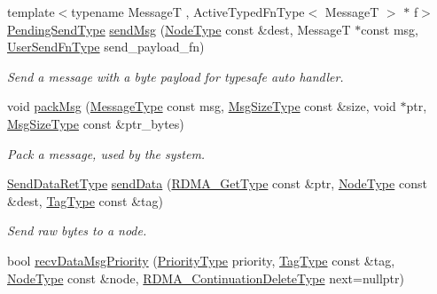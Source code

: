 \begin{DoxyCompactItemize}
{\footnotesize template$<$typename MessageT , Active\+Typed\+Fn\+Type$<$ Message\+T $>$ $\ast$ f$>$ }\\\hyperlink{structvt_1_1messaging_1_1_active_messenger_a3626a6ca76d8ad4ec7c3b47a2c70d3a8}{Pending\+Send\+Type} \hyperlink{group__sendpayload_ga887dfedb337701fc731c67ba19cf86c8}{send\+Msg} (\hyperlink{namespacevt_a866da9d0efc19c0a1ce79e9e492f47e2}{Node\+Type} const \&dest, MessageT $\ast$const msg, \hyperlink{structvt_1_1messaging_1_1_active_messenger_a4b1993ad77436b6ed6c7fd32801c50ed}{User\+Send\+Fn\+Type} send\+\_\+payload\+\_\+fn)
\begin{DoxyCompactList}\small\item\em Send a message with a byte payload for typesafe auto handler. \end{DoxyCompactList}\item 
void \hyperlink{structvt_1_1messaging_1_1_active_messenger_af349201b71468a049f09ccad48ac359d}{pack\+Msg} (\hyperlink{structvt_1_1messaging_1_1_active_messenger_a8a749506cb4813230f9bfeeac1b119c9}{Message\+Type} const msg, \hyperlink{namespacevt_abfa009d900299ac1df967b40ea8f2c8a}{Msg\+Size\+Type} const \&size, void $\ast$ptr, \hyperlink{namespacevt_abfa009d900299ac1df967b40ea8f2c8a}{Msg\+Size\+Type} const \&ptr\+\_\+bytes)
\begin{DoxyCompactList}\small\item\em Pack a message, used by the system. \end{DoxyCompactList}\item 
\hyperlink{structvt_1_1messaging_1_1_active_messenger_a839987e944b6b9c681bc56efbea1f220}{Send\+Data\+Ret\+Type} \hyperlink{structvt_1_1messaging_1_1_active_messenger_ac4385fea0c9cc860b5af24fea2f89a1d}{send\+Data} (\hyperlink{namespacevt_a1cab7f4860f65a49ad2c042d6240f288}{R\+D\+M\+A\+\_\+\+Get\+Type} const \&ptr, \hyperlink{namespacevt_a866da9d0efc19c0a1ce79e9e492f47e2}{Node\+Type} const \&dest, \hyperlink{namespacevt_a84ab281dae04a52a4b243d6bf62d0e52}{Tag\+Type} const \&tag)
\begin{DoxyCompactList}\small\item\em Send raw bytes to a node. \end{DoxyCompactList}\item 
bool \hyperlink{structvt_1_1messaging_1_1_active_messenger_ac4d614d118396fa51ba7f2634e2653fa}{recv\+Data\+Msg\+Priority} (\hyperlink{namespacevt_a86bff9f556eb761b27fc8600d006ac04}{Priority\+Type} priority, \hyperlink{namespacevt_a84ab281dae04a52a4b243d6bf62d0e52}{Tag\+Type} const \&tag, \hyperlink{namespacevt_a866da9d0efc19c0a1ce79e9e492f47e2}{Node\+Type} const \&node, \hyperlink{namespacevt_a4dfad0b5809d9812d60a0311a45ae0c2}{R\+D\+M\+A\+\_\+\+Continuation\+Delete\+Type} next=nullptr)

\end{DoxyCompactItemize}
